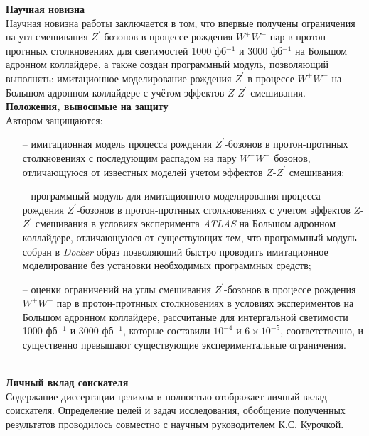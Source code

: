 \textbf{Научная новизна}\\

Научная новизна работы заключается в том, что впервые получены ограничения на угл смешивания ${Z}^{\prime}$-бозонов в
процессе рождения ${W}^{+}$${W}^{-}$ пар в протон-протнных столкновениях для светимостей 1000 фб${}^{−1}$ и 3000 фб${}^{−1}$ на Большом адронном коллайдере, а также создан программный модуль, позволяющий выполнять: имитационное моделирование рождения ${Z}^{\prime}$ в процессе ${W}^{+}{W}^{-}$
на Большом адронном коллайдере с учётом эффектов $Z$-${Z}^{\prime}$ смешивания.
\\

\textbf{Положения, выносимые на защиту}\\

Автором защищаются:
\begin{itemize}
	\item[--] имитационная модель процесса рождения ${Z}^{\prime}$-бозонов в протон-протнных столкновениях с последующим распадом на пару ${W}^{+}{W}^{-}$ бозонов, отличающуюся от известных моделей учетом эффектов $Z$-${Z}^{\prime}$ смешивания;
	
	\item[--] программный модуль для имитационного моделирования процесса
	рождения ${Z}^{\prime}$-бозонов в протон-протнных столкновениях с учетом эффектов $Z$-${Z}^{\prime}$ смешивания в условиях эксперимента \textit{ATLAS} на Большом адронном коллайдере, отличающуюся от существующих тем, что программный модуль собран в \textit{Docker} образ позволяющий быстро проводить имитационное моделирование без установки необходимых программных средств;
	
	\item[--] оценки ограничений на углы смешивания ${Z}^{\prime}$-бозонов в
	процессе рождения ${W}^{+}$${W}^{-}$ пар в протон-протнных столкновениях
	в условиях экспериментов на Большом адронном коллайдере, рассчитаные для интергальной светимости 1000 фб${}^{−1}$ и 3000 фб${}^{−1}$, которые составили  ${10}^{-4}$ и $6\times{10}^{-5}$, соответственно, и существенно превышают существующие экспериментальные ограничения.
	
\end{itemize}
\\

\textbf{Личный вклад соискателя}\\

Содержание диссертации целиком и полностью отображает личный вклад соискателя. Определение целей и задач исследования, обобщение полученных результатов проводилось совместно с научным руководителем К.С. Курочкой.

